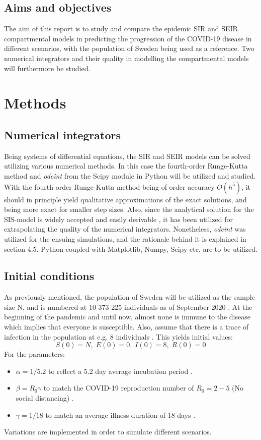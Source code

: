 \documentclass[12pt]{article}
\begin{document}
\subsection{Aims and objectives}
The aim of this report is to study and compare the epidemic SIR and SEIR compartmental models in predicting the progression of the COVID-19 disease in different scenarios, with the population of Sweden being used as a reference. Two numerical integrators and their quality in modelling the compartmental models will furthermore be studied.

\newpage 
\section{Methods}
\subsection{Numerical integrators}
Being systems of differential equations, the SIR and SEIR models can be solved utilizing various numerical methods. In this case the fourth-order Runge-Kutta method and \textit{odeint} from the Scipy module in Python will be utilized and studied. 
With the fourth-order Runge-Kutta method being of order accuracy $O(h^5)$, it should in principle yield qualitative approximations of the exact solutions, and being more exact for smaller step sizes. Also, since the analytical solution for the SIS-model is widely accepted and easily derivable \cite{söder}, it has been utilized for extrapolating the quality of the numerical integrators. Nonetheless, \textit{odeint} was utilized for the ensuing simulations, and the rationale behind it is explained in section 4.5. Python coupled with Matplotlib, Numpy, Scipy etc. are to be utilized.
\subsection{Initial conditions}
As previously mentioned, the population of Sweden will be utilized as the sample size N, and is numbered at 10 373 225 individuals as of September 2020 \cite{Scb}. At the beginning of the pandemic and until now, almost none is immune to the disease which implies that everyone is susceptible. Also, assume that there is a trace of infection in the population at e.g. 8 individuals \cite{smith_moore}. This yields initial values: 
\begin{equation}
S(0) = N, \; E(0) = 0, \; I(0) = 8, \; R(0) = 0
\end{equation}
For the parameters:
\begin{itemize}
  \item $\alpha = 1/5.2$ to reflect a 5.2 day average incubation period \cite{atkeson}.
  \item $\beta = R_0 \gamma$ to match the COVID-19 reproduction number of $R_0 = 2-5$ \newline (No social distancing) \cite{sanche}. 
  \item $\gamma = 1/18$ to match an average illness duration of 18 days \cite{atkeson}.
\end{itemize}
Variations are implemented in order to simulate different scenarios.
\newpage 
\end{document}
